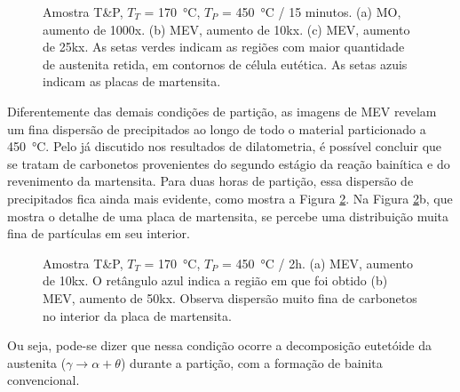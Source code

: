 \begin{figure}
  \centering
  \quad
  \vspace{0pt}
  \caption{Amostra T\&P, $T_T$ = \SI{170}{\degreeCelsius}, $T_P$ = \SI{450}{\degreeCelsius} / 15 minutos. (a) MO, aumento de 1000x. (b) MEV, aumento de 10kx. (c) MEV, aumento de 25kx. As setas verdes indicam as regiões com maior quantidade de austenita retida, em contornos de célula eutética. As setas azuis indicam as placas de martensita.}
  \label{fig:TT170TP450micros}
\end{figure}

Diferentemente das demais condições de partição, as imagens de MEV revelam um fina dispersão de precipitados ao longo de todo o material particionado a \SI{450}{\degreeCelsius}. Pelo já discutido nos resultados de dilatometria, é possível concluir que se tratam de carbonetos provenientes do segundo estágio da reação bainítica e do revenimento da martensita. Para duas horas de partição, essa dispersão de precipitados fica ainda mais evidente, como mostra a Figura \ref{fig:TT170TP4502hmicros}. Na Figura \ref{fig:TT170TP4502hmicros}b, que mostra o detalhe de uma placa de martensita, se percebe uma distribuição muita fina de partículas em seu interior. 

\begin{figure}
  \quad
  \caption{Amostra T\&P, $T_T$ = \SI{170}{\degreeCelsius}, $T_P$ = \SI{450}{\degreeCelsius} / 2h. (a) MEV, aumento de 10kx. O retângulo azul indica a região em que foi obtido (b) MEV, aumento de 50kx. Observa dispersão muito fina de carbonetos no interior da placa de martensita.}
  \label{fig:TT170TP4502hmicros}
\end{figure}

Ou seja, pode-se dizer que nessa condição ocorre a decomposição eutetóide da austenita ($\gamma \rightarrow \alpha + \theta$) durante a partição, com a formação de bainita convencional.